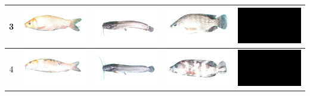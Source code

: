 \begin{longtable}{|c|c|c|c|c|}
    3 & \includegraphics[width=3cm]{gambar/emas/M03} & \includegraphics[width=3cm]{gambar/lele/L03} & \includegraphics[width=3cm]{gambar/nila/N03} & \includegraphics[width=3cm]{gambar/negative_examples/N3} \\
    \hline
    4 & \includegraphics[width=3cm]{gambar/emas/M04} & \includegraphics[width=3cm]{gambar/lele/L04} & \includegraphics[width=3cm]{gambar/nila/N04} & \includegraphics[width=3cm]{gambar/negative_examples/N4} \\
    \hline

\end{longtable}
